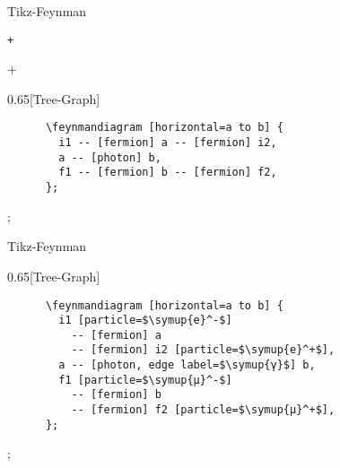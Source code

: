 \begin{frame}[fragile]{%
  Tikz-Feynman
  \hfill
}
  \begin{Packages}
    \texttt+\usepackage{tikz-feynman}+
  \end{Packages}
  \begin{CodeExample}{0.65}[Tree-Graph]
    \begin{verbatim}
      \feynmandiagram [horizontal=a to b] {
        i1 -- [fermion] a -- [fermion] i2,
        a -- [photon] b,
        f1 -- [fermion] b -- [fermion] f2,
      };
    \end{verbatim}
  \CodeResult
    ;
  \end{CodeExample}
\end{frame}

\begin{frame}[fragile]{Tikz-Feynman}
  \begin{CodeExample}{0.65}[Tree-Graph]
    \begin{verbatim}
      \feynmandiagram [horizontal=a to b] {
        i1 [particle=$\symup{e}^-$]
          -- [fermion] a
          -- [fermion] i2 [particle=$\symup{e}^+$],
        a -- [photon, edge label=$\symup{γ}$] b,
        f1 [particle=$\symup{μ}^-$]
          -- [fermion] b
          -- [fermion] f2 [particle=$\symup{μ}^+$],
      };
    \end{verbatim}
  \CodeResult
    ;
  \end{CodeExample}
\end{frame}
